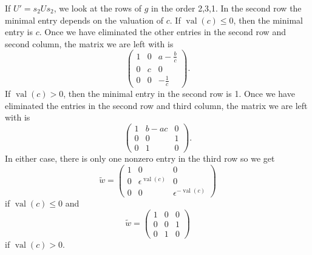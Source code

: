 \documentclass{amsart}
\theoremstyle{definition}
\def\e{\epsilon}
\def\w{\widetilde{w}}
\def\val{\mathop{\mathrm{val}}}
\begin{document}
  If $U' = s_2 U s_2$, we look at the rows of $g$ in the order 2,3,1.  In the
  second row the minimal entry depends on the valuation of $c$.  If $\val(c)
  \le 0$, then the minimal entry is $c$.  Once we have eliminated the other
  entries in the second row and second column, the matrix we are left with is
  \begin{equation}
    \label{eq:w3-row2-c-min}
    \begin{pmatrix}
      1 & 0 & a - \frac{b}{c} \\ 
      0 & c & 0 \\
      0 & 0 & -\frac{1}{c}
      \end{pmatrix}.
  \end{equation}
  If $\val(c) > 0$, then the minimal entry in the second row is 1.  Once we
  have eliminated the entries in the second row and third column, the matrix we
  are left with is
  \begin{equation}
    \label{eq:w3-row2-1-min}
    \begin{pmatrix}
      1 & b-ac & 0\\ 
      0 & 0 & 1 \\
      0 & 1 & 0
      \end{pmatrix}.
  \end{equation}
  In either case, there is only one nonzero entry in the third row so we get
  \begin{equation*}
    \w = \begin{pmatrix}
      1 & 0 & 0 \\
      0 & \e^{\val(c)} & 0\\
      0 & 0 & \e^{-\val(c)}
    \end{pmatrix}
  \end{equation*}
  if $\val(c) \le 0$ and
  \begin{equation*}
    \w = \begin{pmatrix}
      1 & 0 & 0 \\
      0 & 0 & 1\\
      0 & 1 & 0
    \end{pmatrix}
  \end{equation*}
  if $\val(c) > 0$.
\end{document}
